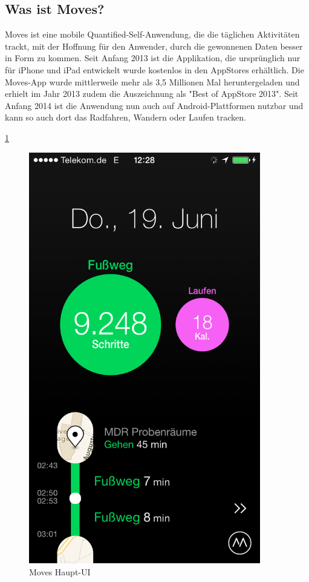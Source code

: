\subsection{Was ist Moves?}
\label{ch:Apps:sec:Moves:subsec:WIM}

Moves ist eine mobile Quantified-Self-Anwendung, die die täglichen Aktivitäten trackt, mit der Hoffnung für den Anwender, durch die gewonnenen Daten besser in Form zu kommen. 
Seit Anfang 2013 ist die Applikation, die ursprünglich nur für iPhone und iPad entwickelt wurde kostenlos in den AppStores erhältlich. 
Die Moves-App wurde mittlerweile mehr als 3,5 Millionen Mal heruntergeladen und erhielt im Jahr 2013 zudem die Auszeichnung als "Best of AppStore 2013".
Seit Anfang 2014 ist die Anwendung nun auch auf Android-Plattformen nutzbar und kann so auch dort das Radfahren, Wandern oder Laufen tracken.

\ref{fig:Haupt-UI}

\begin{figure}
\centering
\includegraphics[width=0.9\textwidth]{images/moves-app-main-ui.PNG}
\caption{Moves Haupt-UI \cite{fig:Haupt-UI}}
\label{fig:Haupt-UI}
\end{figure}

